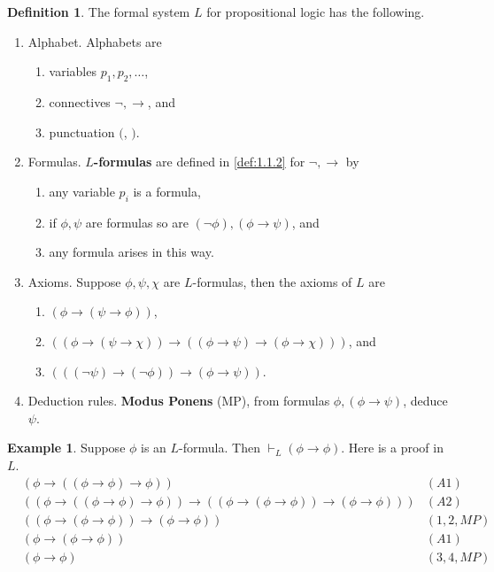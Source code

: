 \documentclass{article}
\newcommand{\rb}[1]{\left( #1 \right)}
\newcommand{\notb}[1]{\rb{\neg #1}}
\newcommand{\impb}[2]{\rb{#1 \rightarrow #2}}
\theoremstyle{definition}\newtheorem{definition}{Definition}[subsection]
\theoremstyle{definition}\newtheorem{remark}[definition]{Remark}
\theoremstyle{definition}\newtheorem*{example}{Example}
\theoremstyle{definition}\newtheorem*{note}{Note}
\begin{document}
\begin{definition}
\label{def:1.2.3}
The formal system \textbf{$ L $} for propositional logic has the following.
\begin{enumerate}
\item Alphabet. Alphabets are
\begin{enumerate}
\item variables $ p_1, p_2, \dots $,
\item connectives $ \neg, \rightarrow $, and
\item punctuation $ ( $, $ ) $.
\end{enumerate}
\item Formulas. \textbf{$ L $-formulas} are defined in \ref{def:1.1.2} for $ \neg, \rightarrow $ by
\begin{enumerate}
\item any variable $ p_i $ is a formula,
\item if $ \phi, \psi $ are formulas so are $ \notb{\phi}, \impb{\phi}{\psi} $, and
\item any formula arises in this way.
\end{enumerate}
\item Axioms. Suppose $ \phi, \psi, \chi $ are $ L $-formulas, then the axioms of $ L $ are
\begin{enumerate}[label=(A\arabic*)]
\item $ \impb{\phi}{\impb{\psi}{\phi}} $,
\item $ \impb{\impb{\phi}{\impb{\psi}{\chi}}}{\impb{\impb{\phi}{\psi}}{\impb{\phi}{\chi}}} $, and
\item $ \impb{\impb{\notb{\psi}}{\notb{\phi}}}{\impb{\phi}{\psi}} $.
\end{enumerate}
\item Deduction rules. \textbf{Modus Ponens} (MP), from formulas $ \phi, \impb{\phi}{\psi} $, deduce $ \psi $.
\end{enumerate}
\end{definition}

\begin{example}
Suppose $ \phi $ is an $ L $-formula. Then $ \vdash_L \impb{\phi}{\phi} $. Here is a proof in $ L $.
\begin{align*}
& \impb{\phi}{\impb{\impb{\phi}{\phi}}{\phi}} & \rb{A1} \\
& \impb{\impb{\phi}{\impb{\impb{\phi}{\phi}}{\phi}}}{\impb{\impb{\phi}{\impb{\phi}{\phi}}}{\impb{\phi}{\phi}}} & \rb{A2} \\
& \impb{\impb{\phi}{\impb{\phi}{\phi}}}{\impb{\phi}{\phi}} & \rb{1, 2, MP} \\
& \impb{\phi}{\impb{\phi}{\phi}} & \rb{A1} \\
& \impb{\phi}{\phi} & \rb{3, 4, MP}
\end{align*}
\end{example}
\end{document}
